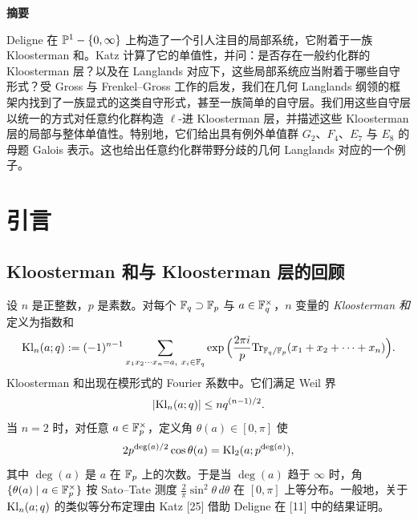 
\begin{center}
{\large\bfseries 摘\quad 要}
\end{center}

Deligne 在 $\mathbb{P}^1-\{0,\infty\}$ 上构造了一个引人注目的局部系统，它附着于一族 Kloosterman 和。Katz 计算了它的单值性，并问：是否存在一般约化群的 Kloosterman 层？以及在 Langlands 对应下，这些局部系统应当附着于哪些自守形式？受 Gross 与 Frenkel--Gross 工作的启发，我们在几何 Langlands 纲领的框架内找到了一族显式的这类自守形式，甚至一族简单的自守层。我们用这些自守层以统一的方式对任意约化群构造 $\ell$-进 Kloosterman 层，并描述这些 Kloosterman 层的局部与整体单值性。特别地，它们给出具有例外单值群 $G_2$、$F_4$、$E_7$ 与 $E_8$ 的母题 Galois 表示。这也给出任意约化群带野分歧的几何 Langlands 对应的一个例子。

\setcounter{section}{-1}
\section{引言}

\subsection{Kloosterman 和与 Kloosterman 层的回顾}

设 $n$ 是正整数，$p$ 是素数。对每个 $\mathbb{F}_q\supset\mathbb{F}_p$ 与 $a\in\mathbb{F}_q^\times$，$n$ 变量的 \emph{Kloosterman 和}定义为指数和
\[
\Kl_n(a;q):=(-1)^{n-1}\sum_{x_1x_2\cdots x_n=a,\ x_i\in\FF_q}
\exp\Big(\frac{2\pi i}{p}\mathrm{Tr}_{\FF_q/\FF_p}(x_1+x_2+\cdots+x_n)\Big).
\]
Kloosterman 和出现在模形式的 Fourier 系数中。它们满足 Weil 界
\begin{equation}
|\mathrm{Kl}_n(a;q)|\le n q^{(n-1)/2}.
\end{equation}
当 $n=2$ 时，对任意 $a\in\mathbb{F}_p^\times$，定义角 $\theta(a)\in[0,\pi]$ 使
\[
2p^{\deg(a)/2}\cos\theta(a)=\mathrm{Kl}_2(a;p^{\deg(a)}),
\]
其中 $\deg(a)$ 是 $a$ 在 $\mathbb{F}_p$ 上的次数。于是当 $\deg(a)$ 趋于 $\infty$ 时，角 $\{\theta(a)\mid a\in\mathbb{F}_p^\times\}$ 按 Sato--Tate 测度 $\frac{2}{\pi}\sin^2\theta\,d\theta$ 在 $[0,\pi]$ 上等分布。一般地，关于 $\mathrm{Kl}_n(a;q)$ 的类似等分布定理由 Katz [25] 借助 Deligne 在 [11] 中的结果证明。

